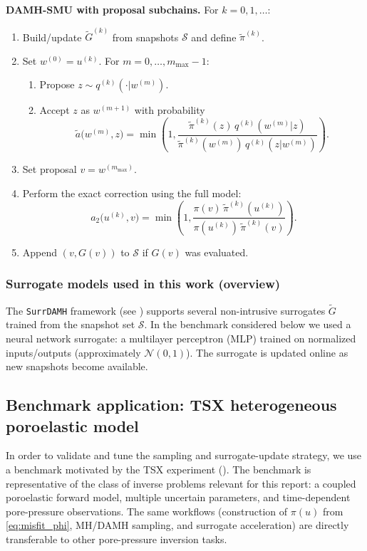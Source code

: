 \begin{mdframed}
\noindent\textbf{DAMH-SMU with proposal subchains.} For $k=0,1,\dots$:
\begin{enumerate}
\item Build/update $\widetilde{G}^{(k)}$ from snapshots $\mathcal{S}$ and define $\widetilde{\pi}^{(k)}$.
\item Set $w^{(0)} = u^{(k)}$. For $m=0,\dots,m_{\max}-1$:
\begin{enumerate}
\item Propose $z\sim q^{(k)}(\cdot|w^{(m)})$.
\item Accept $z$ as $w^{(m+1)}$ with probability
\[
\widetilde{a}\bigl(w^{(m)},z\bigr)=\min\!\left(1,\frac{\widetilde{\pi}^{(k)}(z)\,q^{(k)}(w^{(m)}|z)}
{\widetilde{\pi}^{(k)}(w^{(m)})\,q^{(k)}(z|w^{(m)})}\right).
\]
\end{enumerate}
\item Set proposal $v = w^{(m_{\max})}$.
\item Perform the exact correction using the full model:
\[
a_2\bigl(u^{(k)},v\bigr)=\min\!\left(1,\frac{\pi(v)\,\widetilde{\pi}^{(k)}(u^{(k)})}
{\pi(u^{(k)})\,\widetilde{\pi}^{(k)}(v)}\right).
\]
\item Append $(v,G(v))$ to $\mathcal{S}$ if $G(v)$ was evaluated.
\end{enumerate}
\end{mdframed}

\subsubsection{Surrogate models used in this work (overview)}
The \texttt{SurrDAMH} framework (see \cite{surrDAMH}) supports several non-intrusive surrogates $\widetilde{G}$
trained from the snapshot set $\mathcal{S}$. In the benchmark considered below we used a neural network
surrogate: a multilayer perceptron (MLP) trained on normalized inputs/outputs (approximately
$\mathcal{N}(0,1)$). The surrogate is updated online as new snapshots become available.

\subsection{Benchmark application: TSX heterogeneous poroelastic model}
\label{subsec:tsx_subdomains}
In order to validate and tune the sampling and surrogate-update strategy, we use a benchmark motivated
by the \acrshort{TSX} experiment (\cite{rutqvist2009modeling}). The benchmark is representative of the class of inverse
problems relevant for this report: a coupled poroelastic forward model, multiple uncertain parameters,
and time-dependent pore-pressure observations. The same workflows (construction of $\pi(u)$ from
\eqref{eq:misfit_phi}, MH/DAMH sampling, and surrogate acceleration) are directly transferable to other
pore-pressure inversion tasks.

